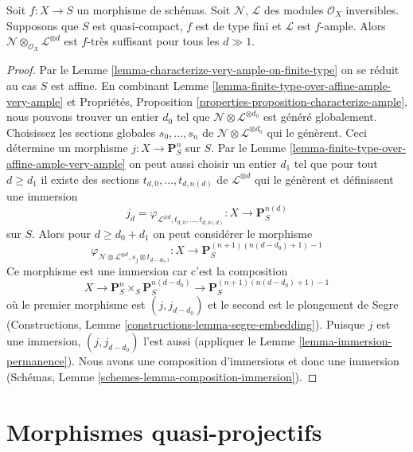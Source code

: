 \begin{lemma}
\label{lemma-invertible-add-enough-ample-very-ample}
Soit $f : X \to S$ un morphisme de schémas. Soit
$\mathcal{N}$, $\mathcal{L}$ des modules $\mathcal{O}_X$ inversibles. Supposons
que $S$ est quasi-compact, $f$ est de type fini
et $\mathcal{L}$ est
$f$-ample. Alors $\mathcal{N} \otimes_{\mathcal{O}_X} \mathcal{L}^{\otimes d}$ est $f$-très suffisant
pour tous les $d \gg 1$.
\end{lemma}

\begin{proof}
Par le Lemme \ref{lemma-characterize-very-ample-on-finite-type} on se réduit au cas
$S$ est affine. En combinant
Lemme \ref{lemma-finite-type-over-affine-ample-very-ample} et Propriétés, Proposition
\ref{properties-proposition-characterize-ample}, nous pouvons trouver un entier
$d_0$ tel que $\mathcal{N} \otimes \mathcal{L}^{\otimes d_0}$
est généré globalement. Choisissez
les sections globales $s_0, \ldots, s_n$
de $\mathcal{N} \otimes \mathcal{L}^{\otimes d_0}$ qui le génèrent. Ceci détermine
un morphisme $j : X \to \mathbf{P}^n_S$
sur $S$. Par le Lemme
\ref{lemma-finite-type-over-affine-ample-very-ample} on peut aussi choisir un entier
$d_1$ tel que pour tout $d \geq d_1$
il existe des sections $t_{d, 0}, \ldots, t_{d, n(d)}$ de $\mathcal{L}^{\otimes d}$
qui le génèrent et définissent une
immersion
$$
j_d = \varphi_{\mathcal{L}^{\otimes d}, t_{d, 0}, \ldots, t_{d, n(d)}} :
X
\longrightarrow
\mathbf{P}^{n(d)}_S
$$
sur $S$. Alors pour $d \geq d_0 + d_1$ on peut considérer le
morphisme
$$
\varphi_{\mathcal{N} \otimes \mathcal{L}^{\otimes d},
s_j \otimes t_{d - d_0, i}} :
X
\longrightarrow
\mathbf{P}^{(n + 1)(n(d - d_0) + 1) - 1}_S
$$
Ce morphisme est une immersion car c'est la composition
$$
X \to \mathbf{P}^n_S \times_S \mathbf{P}^{n(d - d_0)}_S
\to \mathbf{P}^{(n + 1)(n(d - d_0) + 1) - 1}_S
$$
où le premier morphisme est $(j, j_{d - d_0})$ et
le second est le plongement
de Segre (Constructions, Lemme \ref{constructions-lemma-segre-embedding}). Puisque
$j$ est une immersion, $(j, j_{d - d_0})$
l'est aussi (appliquer le Lemme \ref{lemma-immersion-permanence}). Nous avons une composition
d'immersions et
donc une immersion (Schémas, Lemme \ref{schemes-lemma-composition-immersion}).
\end{proof}










\section{Morphismes quasi-projectifs}
\label{section-quasi-projective}

